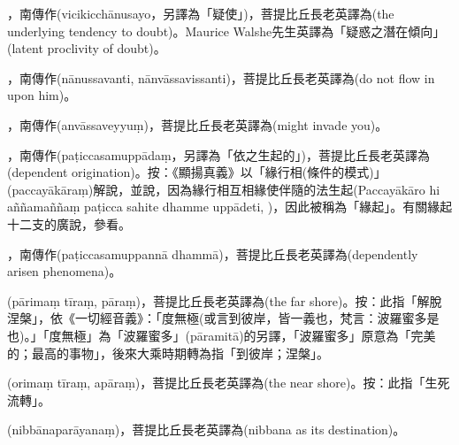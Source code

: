 \startitemgroup[noteitems]
\item{}，南傳作(vicikicchānusayo，另譯為「疑使」)，菩提比丘長老英譯為(the underlying tendency to doubt)。Maurice Walshe先生英譯為「疑惑之潛在傾向」(latent proclivity of doubt)。
\stopitemgroup

\startitemgroup[noteitems]
\item{}，南傳作(nānussavanti, nānvāssavissanti)，菩提比丘長老英譯為(do not flow in upon him)。
\item{}，南傳作(anvāssaveyyuṃ)，菩提比丘長老英譯為(might invade you)。
\stopitemgroup

\startitemgroup[noteitems]
\item{}，南傳作(paṭiccasamuppādaṃ，另譯為「依之生起的」)，菩提比丘長老英譯為(dependent origination)。按：《顯揚真義》以「緣行相(條件的模式)」(paccayākāraṃ)解說，並說，因為緣行相互相緣使伴隨的法生起(Paccayākāro hi aññamaññaṃ paṭicca sahite dhamme uppādeti, )，因此被稱為「緣起」。有關緣起十二支的廣說，參看。
\item{}，南傳作(paṭiccasamuppannā dhammā)，菩提比丘長老英譯為(dependently arisen phenomena)。
\stopitemgroup

\startitemgroup[noteitems]
\item{}(pārimaṃ tīraṃ, pāraṃ)，菩提比丘長老英譯為(the far shore)。按：此指「解脫涅槃」，依《一切經音義》：「度無極(或言到彼岸，皆一義也，梵言：波羅蜜多是也)。」「度無極」為「波羅蜜多」(pāramitā)的另譯，「波羅蜜多」原意為「完美的；最高的事物」，後來大乘時期轉為指「到彼岸；涅槃」。
\item{}(orimaṃ tīraṃ, apāraṃ)，菩提比丘長老英譯為(the near shore)。按：此指「生死流轉」。
\item{}(nibbānaparāyanaṃ)，菩提比丘長老英譯為(nibbana as its destination)。
\stopitemgroup

